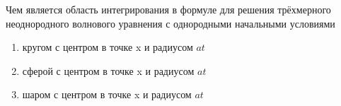 Чем является область интегрирования в формуле для решения трёхмерного неоднородного волнового уравнения с однородными начальными условиями

\begin{enumerate}[label=\arabic*)]
    \item кругом с центром в точке x и радиусом \(at\)
    \item сферой с центром в точке x и радиусом \(at\)
    \item шаром с центром в точке x и радиусом \(at\)
\end{enumerate}

